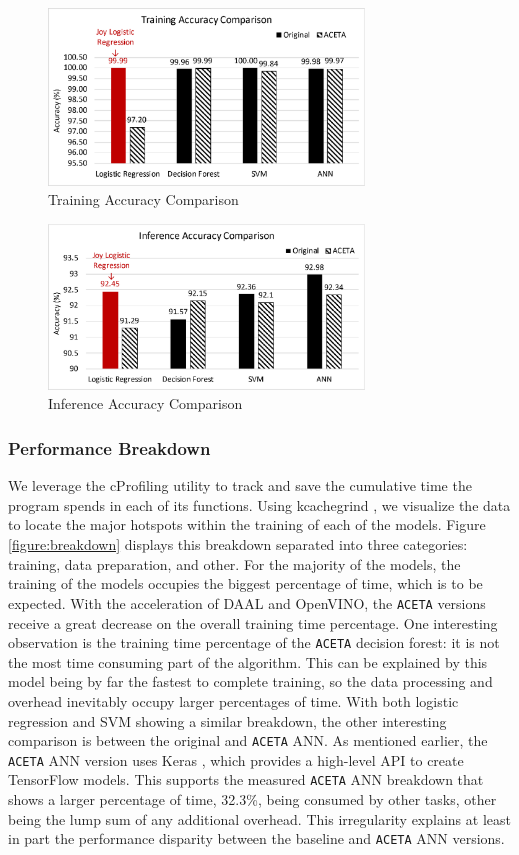 \begin{figure}[h!]
	\centering
	\includegraphics[width=3.3in]{./fig/training-accuracy.eps}
	\caption{Training Accuracy Comparison}
	\label{figure:training-accuracy}
\end{figure}

\begin{figure}[h!]
	\centering
	\includegraphics[width=3.3in]{./fig/inference-accuracy.eps}
	\caption{Inference Accuracy Comparison}
	\label{figure:inference-accuracy}
\end{figure}

\subsubsection{Performance Breakdown}
We leverage the cProfiling utility to track and save the cumulative time the program spends in each of its functions. Using kcachegrind \cite{kcachegrind}, we visualize the data to locate the major hotspots within the training of each of the models. Figure \ref{figure:breakdown} displays this breakdown separated into three categories: training, data preparation, and other. For the majority of the models, the training of the models occupies the biggest percentage of time, which is to be expected. With the acceleration of DAAL and OpenVINO, the \texttt{ACETA} versions receive a great decrease on the overall training time percentage. One interesting observation is the training time percentage of the \texttt{ACETA} decision forest: it is not the most time consuming part of the algorithm. This can be explained by this model being by far the fastest to complete training, so the data processing and overhead inevitably occupy larger percentages of time. With both logistic regression and SVM showing a similar breakdown, the other interesting comparison is between the original and \texttt{ACETA} ANN. As mentioned earlier, the \texttt{ACETA} ANN version uses Keras \cite{keras}, which provides a high-level API to create TensorFlow models. This supports the measured \texttt{ACETA} ANN breakdown that shows a larger percentage of time, 32.3\%, being consumed by other tasks, other being the lump sum of any additional overhead. This irregularity explains at least in part the performance disparity between the baseline and \texttt{ACETA} ANN versions.

